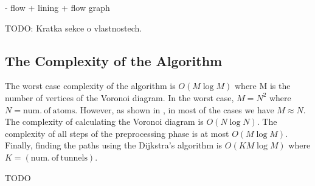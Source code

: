 \documentclass[11pt]{article} %
\begin{document}
- flow + lining + flow graph

TODO: Kratka sekce o vlastnostech.


\subsection{The Complexity of the Algorithm}

The worst case complexity of the algorithm is $O(M \log M)$ where M is the number of vertices of the Voronoi diagram. In the worst case, $M=N^2$ where $N=\mathrm{num.\ of\ atoms}$. However, as shown in \cite{vorcomplexitty}, in most of the cases we have $M\approx N$. The complexity of calculating the Voronoi diagram is $O(N \log N)$. The complexity of all steps of the preprocessing phase is at most $O(M \log M)$. Finally, finding the paths using the Dijkstra’s algorithm is $O(K M \log M)$ where $K = (\mathrm{num.\ of\ tunnels})$.


TODO
\end{document}

